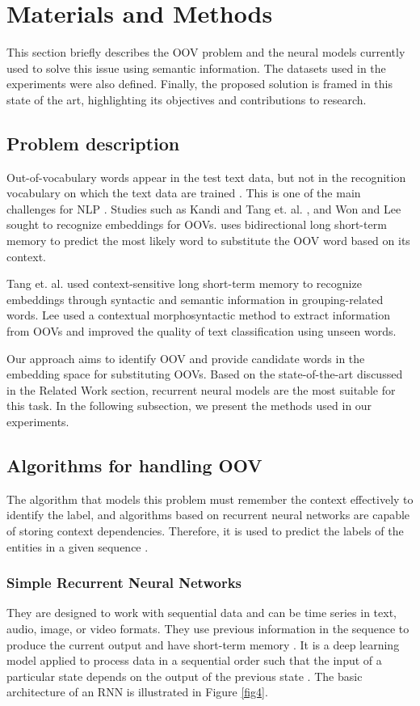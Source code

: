 \documentclass[conference]{IEEEtran}
\begin{document}
\section{Materials and Methods}

This section briefly describes the OOV problem and the neural models currently used to solve this issue using semantic information. The datasets used in the experiments were also defined. Finally, the proposed solution is framed in this state of the art, highlighting its objectives and contributions to research.


\subsection{Problem description}
Out-of-vocabulary words appear in the test text data, but not in the recognition vocabulary on which the text data are trained \cite{b7}. This is one of the main challenges for NLP \cite{b10}. Studies such as Kandi \cite{b7} and Tang et. al. \cite{b13}, and Won and Lee \cite{b14} sought to recognize embeddings for OOVs. \cite{b7} uses bidirectional long short-term memory to predict the most likely word to substitute the OOV word based on its context.

Tang et. al. \cite{b13} used context-sensitive long short-term memory to recognize embeddings through syntactic and semantic information in grouping-related words. Lee \cite{b14} used a contextual morphosyntactic method to extract information from OOVs and improved the quality of text classification using unseen words.

Our approach aims to identify OOV and provide candidate words in the embedding space for substituting OOVs. Based on the state-of-the-art discussed in the Related Work section, recurrent neural models are the most suitable for this task. In the following subsection, we present the methods used in our experiments.


\subsection{Algorithms for handling OOV}
The algorithm that models this problem must remember the context effectively to identify the label, and algorithms based on recurrent neural networks are capable of storing context dependencies. Therefore, it is used to predict the labels of the entities in a given sequence \cite{b6}.

\subsubsection{Simple Recurrent Neural Networks}
They are designed to work with sequential data and can be time series in text, audio, image, or video formats. They use previous information in the sequence to produce the current output and have short-term memory \cite{b6}. It is a deep learning model applied to process data in a sequential order such that the input of a particular state depends on the output of the previous state \cite{b18}. The basic architecture of an RNN is illustrated in Figure \ref{fig4}.
\end{document}

